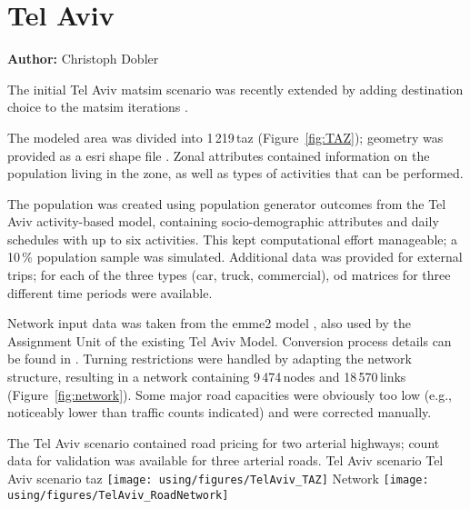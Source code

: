 \section{Tel Aviv}
\label{sec:telaviv}
\hfill \textbf{Author:} Christoph Dobler


The initial Tel Aviv \gls{matsim} scenario \citep[][]{BekhorEtAl_TRB_2011} was recently extended by adding destination choice to the \gls{matsim} iterations \citep[][]{DoblerEtAl_TechRep_IVT_2014}.

The modeled area was divided into 1\,219\,\gls{taz} (Figure~\ref{fig:TAZ}); geometry was provided as a \gls{esri} shape file \citep{ESRI-ShapeFile_manual_1998}. Zonal attributes contained information on the population living in the zone, as well as types of activities that can be performed.

The population was created using population generator outcomes from the Tel Aviv activity-based model, containing socio-demographic attributes and daily schedules with up to six activities. This kept computational effort manageable; a 10\,\% population sample was simulated. Additional data was provided for external trips; for each of the three types (car, truck, commercial), \gls{od} matrices for three different time periods were available.

Network input data was taken from the \gls{emme2} model \citep[see][]{EMME_Webpage_2011}, also used by the Assignment Unit of the existing Tel Aviv Model. Conversion process details can be found in \citet{GaoWEtAl_TRR_2010}. Turning restrictions were handled by adapting the network structure, resulting in a network containing 9\,474\,nodes and 18\,570\,links (Figure~\ref{fig:network}). Some major road capacities were obviously too low (e.g.,\,noticeably lower than traffic counts indicated) and were corrected manually.

The Tel Aviv scenario contained road pricing for two arterial highways; count data for validation was available for three arterial roads.
%
\createfigure%
{Tel Aviv scenario}%
{Tel Aviv scenario}%
{\label{fig:telavivscenario}}%
{%
  \createsubfigure%
  {\protect\gls{taz}}%
  {\texttt{[image: using/figures/TelAviv\_TAZ]}}%
  {\label{fig:TAZ}}%
  {}%
  \createsubfigure%
  {Network}%
	{\texttt{[image: using/figures/TelAviv\_RoadNetwork]}}%
  {\label{fig:network}}%
  {}%
}%
{}

